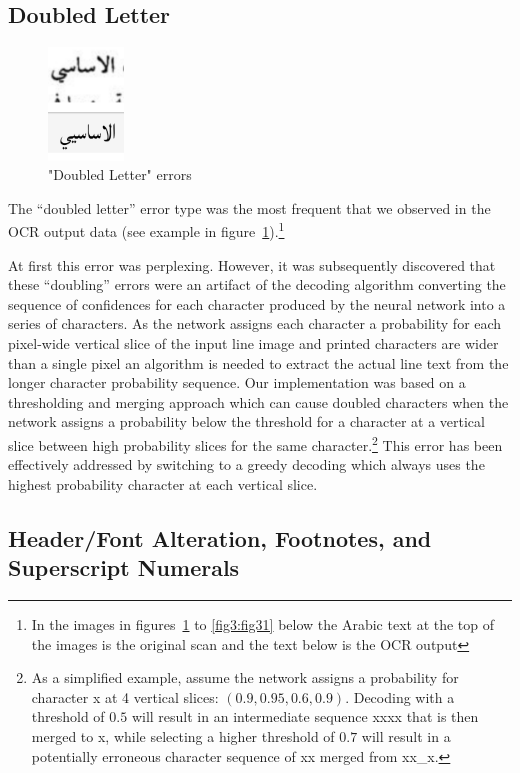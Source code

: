 \subsection{Doubled Letter}

\begin{figure}
	\centering
	\includegraphics[height=3cm]{images/image20.png}
	\caption{"Doubled Letter" errors}
	\label{fig3:fig4}
\end{figure}

The “doubled letter” error type was the most frequent that we observed in the
OCR output data (see example in figure~\ref{fig3:fig4}).\footnote{In the images
in figures~\ref{fig3:fig4} to \ref{fig3:fig31}  below the Arabic text at the top
of the images is the original scan and the text below is the OCR output}
                   
At first this error was perplexing. However, it was subsequently discovered
that these “doubling” errors were an artifact of the decoding algorithm
converting the sequence of confidences for each character produced by the
neural network into a series of characters. As the network assigns each
character a probability for each pixel-wide vertical slice of the input line
image and printed characters are wider than a single pixel an algorithm is
needed to extract the actual line text from the longer character probability
sequence. Our implementation was based on a thresholding and merging approach
which can cause doubled characters when the network assigns a probability below
the threshold for a character at a vertical slice between high probability
slices for the same character.\footnote{As a simplified example, assume the
network assigns a probability for character x at 4 vertical slices: $(0.9, 0.95,
0.6, 0.9)$. Decoding with a threshold of $0.5$ will result in an intermediate
sequence xxxx that is then merged to x, while selecting a higher threshold of
$0.7$ will result in a potentially erroneous character sequence of xx merged from
xx\_x.} This error has been effectively addressed by switching to a greedy
decoding which always uses the highest probability character at each vertical
slice.

\subsection{Header/Font Alteration, Footnotes, and Superscript Numerals}

